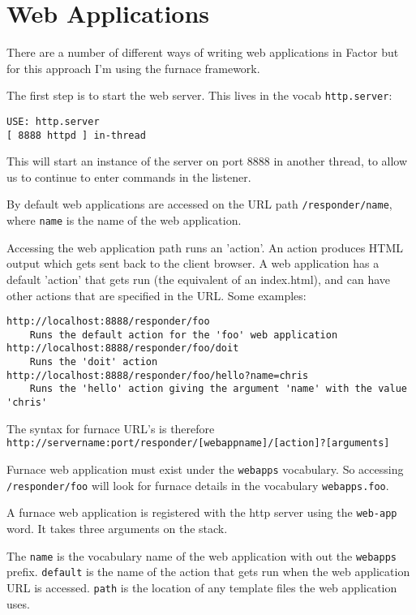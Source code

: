 \chapter{Web Applications}\label{webapps}

There are a number of different ways of writing web applications in
Factor but for this approach I'm using the furnace framework.

The first step is to start the web server. This lives in the vocab \texttt{http.server}:
\begin{verbatim}
USE: http.server
[ 8888 httpd ] in-thread
\end{verbatim}

This will start an instance of the server on port 8888 in another
thread, to allow us to continue to enter commands in the listener.

By default web applications are accessed on the URL path
\texttt{/responder/name}, where \texttt{name} is the name of the web application.

Accessing the web application path runs an 'action'. An action
produces HTML output which gets sent back to the client browser. A web
application has a default 'action' that gets run (the equivalent of an
index.html), and can have other actions that are specified in the
URL. Some examples:
\begin{verbatim}
http://localhost:8888/responder/foo
    Runs the default action for the 'foo' web application
http://localhost:8888/responder/foo/doit
    Runs the 'doit' action
http://localhost:8888/responder/foo/hello?name=chris
    Runs the 'hello' action giving the argument 'name' with the value 'chris'
\end{verbatim}

The syntax for furnace URL's is therefore
\texttt{http://servername:port/responder/[webappname]/[action]?[arguments]}

Furnace web application must exist under the \texttt{webapps} vocabulary. So
accessing \texttt{/responder/foo} will look for furnace details in the
vocabulary \texttt{webapps.foo}.

A furnace web application is registered with the http server using the
\verb|web-app| word. It takes three arguments on the stack.


The \texttt{name} is the vocabulary name of the web application with
out the \texttt{webapps} prefix. \texttt{default} is the name of the
action that gets run when the web application URL is
accessed. \texttt{path} is the location of any template files the web
application uses.

